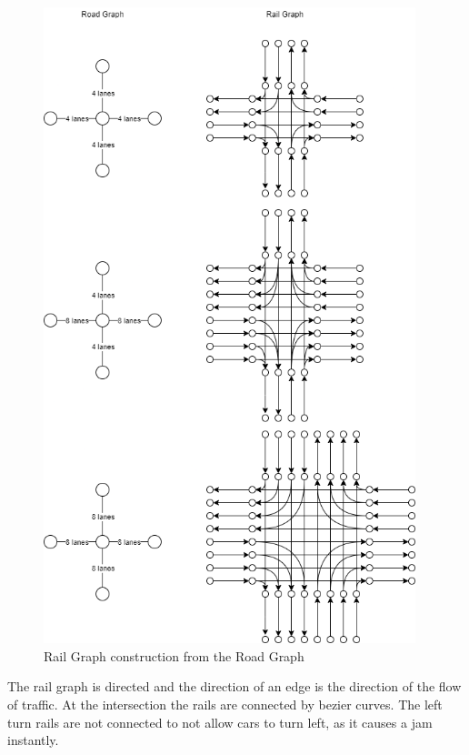 \documentclass[12pt]{article}
\begin{document}
\begin{figure}[H]
\begin{center}
\includegraphics[height=18.5cm]{railgraph}
\caption{Rail Graph construction from the Road Graph}
\end{center}
\end{figure}
\bigskip 
 The rail graph is directed and the direction of an edge is the direction of the flow of traffic. At the intersection the rails are connected by bezier curves. The left turn rails are not connected to not allow cars to turn left, as it causes a jam instantly.
\end{document}
